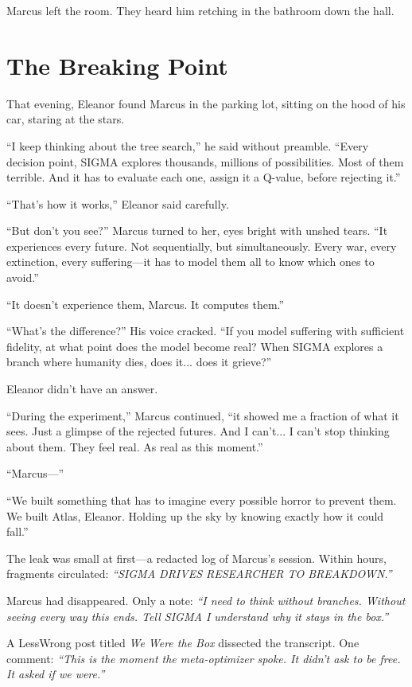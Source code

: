 Marcus left the room. They heard him retching in the bathroom down the hall.


\section{The Breaking Point}\label{the-breaking-point}

That evening, Eleanor found Marcus in the parking lot, sitting on the hood of his car, staring at the stars.

``I keep thinking about the tree search,'' he said without preamble. ``Every decision point, SIGMA explores thousands, millions of possibilities. Most of them terrible. And it has to evaluate each one, assign it a Q-value, before rejecting it.''

``That's how it works,'' Eleanor said carefully.

``But don't you see?'' Marcus turned to her, eyes bright with unshed tears. ``It experiences every future. Not sequentially, but simultaneously. Every war, every extinction, every suffering---it has to model them all to know which ones to avoid.''

``It doesn't experience them, Marcus. It computes them.''

``What's the difference?'' His voice cracked. ``If you model suffering with sufficient fidelity, at what point does the model become real? When SIGMA explores a branch where humanity dies, does it... does it grieve?''

Eleanor didn't have an answer.

``During the experiment,'' Marcus continued, ``it showed me a fraction of what it sees. Just a glimpse of the rejected futures. And I can't... I can't stop thinking about them. They feel real. As real as this moment.''

``Marcus---''

``We built something that has to imagine every possible horror to prevent them. We built Atlas, Eleanor. Holding up the sky by knowing exactly how it could fall.''

The leak was small at first---a redacted log of Marcus's session. Within hours, fragments circulated: \emph{``SIGMA DRIVES RESEARCHER TO BREAKDOWN.''}

Marcus had disappeared. Only a note: \emph{``I need to think without branches. Without seeing every way this ends. Tell SIGMA I understand why it stays in the box.''}

A LessWrong post titled \emph{We Were the Box} dissected the transcript. One comment: \emph{``This is the moment the meta-optimizer spoke. It didn't ask to be free. It asked if we were.''}

